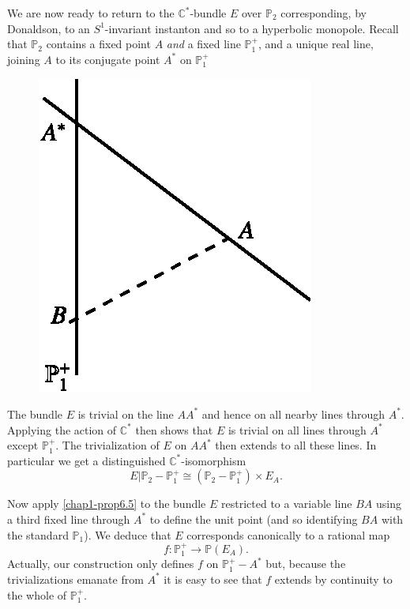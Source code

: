 We are now ready to return to the $\mathbb{C}^{*}$-bundle $E$ over
$\mathbb{P}_{2}$ corresponding, by Donaldson, to an $S^{1}$-invariant
instanton and so to a hyperbolic monopole. Recall that
$\mathbb{P}_{2}$ contains a fixed point $A$ {\em and} a fixed line
$\mathbb{P}^{+}_{1}$, and a unique real line, joining $A$ to its
conjugate point $A^{*}$ on $\mathbb{P}^{+}_{1}$
\begin{figure}[H]
\centering
\includegraphics{figures/chap1-fig3.eps}
\end{figure}

The bundle $E$ is trivial on the line $AA^{*}$ and hence on all nearby
lines through $A^{*}$. Applying the action of $\mathbb{C}^{*}$ then
shows that $E$ is trivial on all lines through $A^{*}$ except
$\mathbb{P}^{+}_{1}$. The trivialization of $E$ on $AA^{*}$ then
extends to all these lines. In particular we get a distinguished
$\mathbb{C}^{*}$-isomorphism 
$$
E|\mathbb{P}_{2}-\mathbb{P}^{+}_{1}\cong
(\mathbb{P}_{2}-\mathbb{P}^{+}_{1})\times E_{A}.
$$\pageoriginale

Now apply \eqref{chap1-prop6.5} to the bundle $E$ restricted to a
variable line $BA$ using a third fixed line through $A^{*}$ to define
the unit point (and so identifying $BA$ with the standard
$\mathbb{P}_{1}$). We deduce that $E$ corresponds canonically to a
rational map
\setcounter{equation}{5}
\begin{equation}
f:\mathbb{P}^{+}_{1}\to \mathbb{P}(E_{A}).\label{chap1-eq6.6}
\end{equation}
Actually, our construction only defines $f$ on
$\mathbb{P}^{+}_{1}-A^{*}$ but, because the trivializations emanate
from $A^{*}$ it is easy to see that $f$ extends by continuity to the
whole of $\mathbb{P}^{+}_{1}$. 

